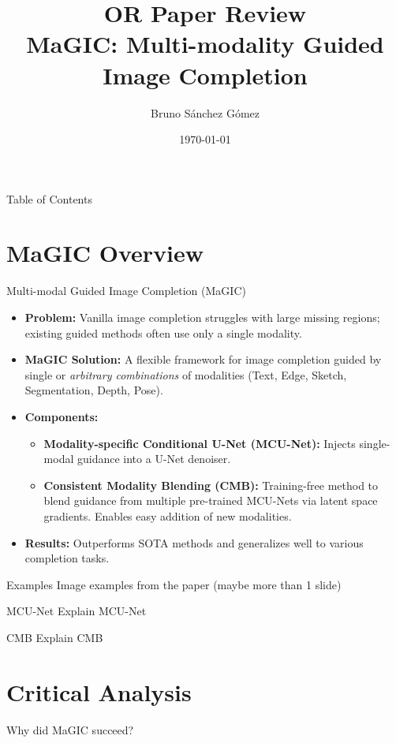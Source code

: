 \documentclass{beamer}
\title{OR Paper Review \\MaGIC:  Multi-modality Guided Image Completion}
\author{Bruno Sánchez Gómez}
\date{\today}
\begin{document}
\begin{frame}
    \titlepage
\end{frame}


\begin{frame}{Table of Contents}
    \tableofcontents
\end{frame}

\section{MaGIC Overview}
\begin{frame}{Multi-modal Guided Image Completion (MaGIC)}
    \begin{itemize}
        \item \textbf{Problem:} Vanilla image completion struggles with large missing regions; existing guided methods often use only a single modality.
        \item \textbf{MaGIC Solution:} A flexible framework for image completion guided by single or \textit{arbitrary combinations} of modalities (Text, Edge, Sketch, Segmentation, Depth, Pose).
        \item \textbf{Components:}
        \begin{itemize}
            \item \textbf{Modality-specific Conditional U-Net (MCU-Net):} Injects single-modal guidance into a U-Net denoiser.
            \item \textbf{Consistent Modality Blending (CMB):} Training-free method to blend guidance from multiple pre-trained MCU-Nets via latent space gradients. Enables easy addition of new modalities.
        \end{itemize}
        \item \textbf{Results:} Outperforms SOTA methods and generalizes well to various completion tasks.
    \end{itemize}
\end{frame}

\begin{frame}{Examples}
    Image examples from the paper (maybe more than 1 slide)
\end{frame}

\begin{frame}{MCU-Net}
    Explain MCU-Net
\end{frame}

\begin{frame}{CMB}
    Explain CMB
\end{frame}

\section{Critical Analysis}
\begin{frame}{Why did MaGIC succeed?}
    
\end{frame}
\end{document}
